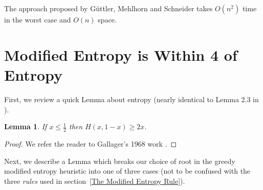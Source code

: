 \documentclass[letterpaper,12pt,titlepage,oneside,final]{book}
\theoremstyle{plain}
\newtheorem{lem}[thm]{Lemma}
\begin{document}
The approach proposed by G{\"u}ttler, Mehlhorn and Schneider takes $O(n^2)$ time in the worst case and $O(n)$ space.

\section{Modified Entropy is Within 4 of Entropy}

First, we review a quick Lemma about entropy (nearly identical to Lemma 2.3 in \cite{bayer1975improved}).

\begin{lem}\label{entr2x}
If $x \leq \frac{1}{2}$ then $H(x, 1-x) \geq 2x$.
\end{lem}
\begin{proof}
We refer the reader to Gallager's 1968 work \cite{gallager1968information}.
\end{proof}

Next, we describe a Lemma which breaks our choice of root in the greedy modified entropy heuristic into one of three cases (not to be confused with the three \textit{rules} used in section~\ref{The Modified Entropy Rule}). 
\end{document}
